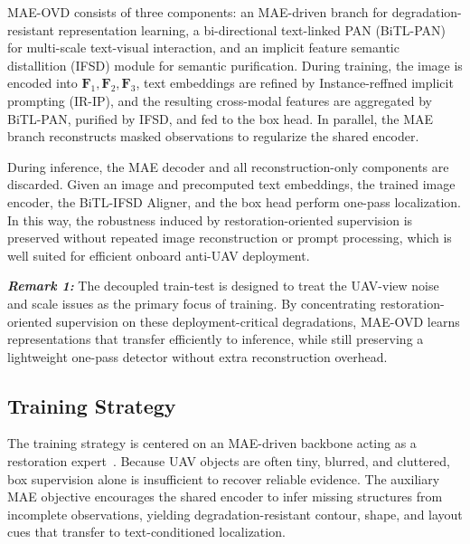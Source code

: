 \documentclass[letterpaper, 10 pt, conference]{ieeeconf}  %
\begin{document}
MAE-OVD consists of three components: an MAE-driven branch for degradation-resistant representation learning, a bi-directional text-linked PAN (BiTL-PAN) for multi-scale text-visual interaction, and an implicit
feature semantic distallition (IFSD) module for semantic purification. During training, the image is encoded into $\mathbf{F}_1,\mathbf{F}_2,\mathbf{F}_3$, text embeddings are refined by Instance-reffned implicit prompting (IR-IP), and the resulting cross-modal features are aggregated by BiTL-PAN, purified by IFSD, and fed to the box head. In parallel, the MAE branch reconstructs masked observations to regularize the shared encoder.

During inference, the MAE decoder and all reconstruction-only components are discarded. Given an image and precomputed text embeddings, the trained image encoder, the BiTL-IFSD Aligner, and the box head perform one-pass localization. In this way, the robustness induced by restoration-oriented supervision is preserved without repeated image reconstruction or prompt processing, which is well suited for efficient onboard anti-UAV deployment.

\noindent\textbf{\textit{Remark 1:}} The decoupled train-test is designed to treat the UAV-view noise and scale issues as the primary focus of training. By concentrating restoration-oriented supervision on these deployment-critical degradations, MAE-OVD learns representations that transfer efficiently to inference, while still preserving a lightweight one-pass detector without extra reconstruction overhead.

\subsection{Training Strategy}
\label{subsec:mae-backbone}

The training strategy is centered on an MAE-driven backbone acting as a restoration expert~\cite{he2022mae,kang2023deblurmae}. Because UAV objects are often tiny, blurred, and cluttered, box supervision alone is insufficient to recover reliable evidence. The auxiliary MAE objective encourages the shared encoder to infer missing structures from incomplete observations, yielding degradation-resistant contour, shape, and layout cues that transfer to text-conditioned localization.
\end{document}
